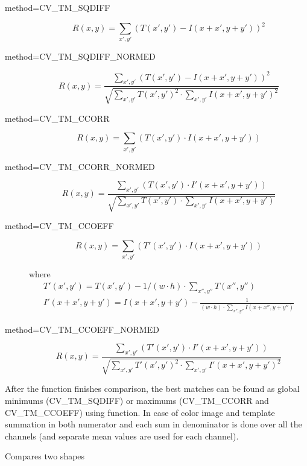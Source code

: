 \begin{description}
\item[method=CV\_TM\_SQDIFF]
\[ R(x,y)=\sum_{x',y'} (T(x',y')-I(x+x',y+y'))^2 \]

\item[method=CV\_TM\_SQDIFF\_NORMED]
\[ R(x,y)=\frac
{\sum_{x',y'} (T(x',y')-I(x+x',y+y'))^2}
{\sqrt{\sum_{x',y'}T(x',y')^2 \cdot \sum_{x',y'} I(x+x',y+y')^2}}
\]

\item[method=CV\_TM\_CCORR]
\[ R(x,y)=\sum_{x',y'} (T(x',y') \cdot I(x+x',y+y')) \]

\item[method=CV\_TM\_CCORR\_NORMED]
\[ R(x,y)=\frac
{\sum_{x',y'} (T(x',y') \cdot I'(x+x',y+y'))}
{\sqrt{\sum_{x',y'}T(x',y') \cdot \sum_{x',y'} I(x+x',y+y')}}
\]

\item[method=CV\_TM\_CCOEFF]
\[ R(x,y)=\sum_{x',y'} (T'(x',y') \cdot I(x+x',y+y')) \]

where
\[ 
\begin{array}{l}
T'(x',y')=T(x',y') - 1/(w \cdot h) \cdot \sum_{x'',y''} T(x'',y'')\\
I'(x+x',y+y')=I(x+x',y+y') - \frac{1}{(w \cdot h) \cdot \sum_{x'',y''} I(x+x'',y+y'')}
\end{array}
\]

\item[method=CV\_TM\_CCOEFF\_NORMED]
\[ R(x,y)=\frac
{ \sum_{x',y'} (T'(x',y') \cdot I'(x+x',y+y')) }
{ \sqrt{\sum_{x',y'}T'(x',y')^2 \cdot \sum_{x',y'} I'(x+x',y+y')^2} }
\]
\end{description}

After the function finishes comparison, the best matches can be found as global minimums (CV\_TM\_SQDIFF) or maximums (CV\_TM\_CCORR and CV\_TM\_CCOEFF) using  function. In case of color image and template summation in both numerator and each sum in denominator is done over all the channels (and separate mean values are used for each channel).

\label{MatchShapes}

Compares two shapes


